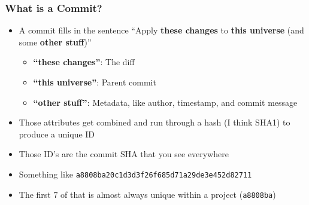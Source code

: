 \documentclass{beamer}
\begin{document}
\begin{frame}
  \frametitle{What is a Commit?}

  \begin{itemize}
    \pause
  \item A commit fills in the sentence ``Apply \textbf{these changes} to \textbf{this universe} (and some \textbf{other stuff})''
    \begin{itemize}
      \pause
    \item \textbf{``these changes''}: The diff
      \pause
    \item \textbf{``this universe''}: Parent commit
      \pause
    \item \textbf{``other stuff''}: Metadata, like author, timestamp, and commit message
    \end{itemize}
    \pause
  \item Those attributes get combined and run through a hash (I think SHA1) to produce a unique ID
    \pause
  \item Those ID's are the commit SHA that you see everywhere
    \pause
  \item Something like \texttt{a8808ba20c1d3d3f26f685d71a29de3e452d82711}
    \pause
  \item The first 7 of that is almost always unique within a project (\texttt{a8808ba})
  \end{itemize}
\end{frame}

\newcommand{\commit}[3]{
  \node[circle, draw, radius=0.5cm, fill=green](#1) at #2{\texttt{#3}};
}
\newcommand{\selectedcommit}[3]{
  \node[circle, draw, radius=0.5cm, fill=green, thick](#1) at #2{\texttt{#3}};
}
\newcommand{\pendingcommit}[3]{
  \node[circle, draw, radius=0.5cm, fill=yellow](#1) at #2{\textcolor{yellow}{\texttt{#3}}};
}
\newcommand{\textbox}[3]{
  \node(#1)[draw, fill=white, rounded corners, align=left] at #2 {#3};
}
\end{document}
